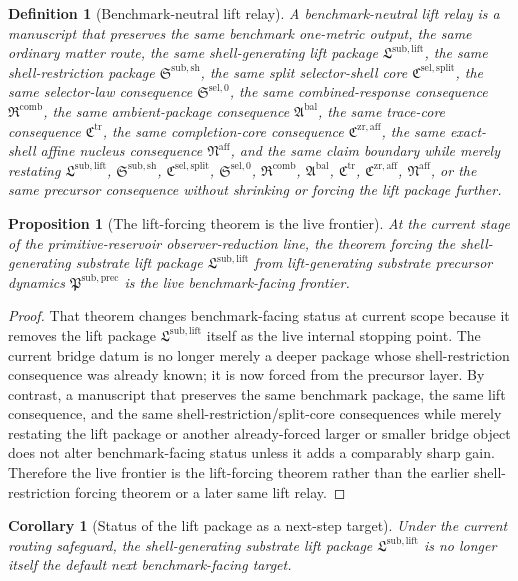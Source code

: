 \documentclass[11pt]{article}
\newcommand{\CompletionCore}{\mathfrak C^{\mathrm{zr,aff}}}
\newcommand{\TraceCore}{\mathfrak C^{\mathrm{tr}}}
\newcommand{\AffineNucleus}{\mathfrak N^{\mathrm{aff}}}
\newcommand{\AmbientPackage}{\mathfrak A^{\mathrm{bal}}}
\newcommand{\CombinedLaw}{\mathfrak R^{\mathrm{comb}}}
\newcommand{\SelectorLaw}{\mathfrak S^{\mathrm{sel},0}}
\newcommand{\SelectorCore}{\mathfrak C^{\mathrm{sel,split}}}
\newcommand{\ShellRestriction}{\mathfrak S^{\mathrm{sub,sh}}}
\newcommand{\LiftPackage}{\mathfrak L^{\mathrm{sub,lift}}}
\newcommand{\PrecursorPackage}{\mathfrak P^{\mathrm{sub,prec}}}
\newtheorem{definition}{Definition}
\newtheorem{proposition}{Proposition}
\newtheorem{corollary}{Corollary}
\begin{document}
\begin{definition}[Benchmark-neutral lift relay]
A \emph{benchmark-neutral lift relay} is a manuscript that preserves the same benchmark one-metric output, the same ordinary matter route, the same shell-generating lift package \(\LiftPackage\), the same shell-restriction package \(\ShellRestriction\), the same split selector-shell core \(\SelectorCore\), the same selector-law consequence \(\SelectorLaw\), the same combined-response consequence \(\CombinedLaw\), the same ambient-package consequence \(\AmbientPackage\), the same trace-core consequence \(\TraceCore\), the same completion-core consequence \(\CompletionCore\), the same exact-shell affine nucleus consequence \(\AffineNucleus\), and the same claim boundary while merely restating \(\LiftPackage\), \(\ShellRestriction\), \(\SelectorCore\), \(\SelectorLaw\), \(\CombinedLaw\), \(\AmbientPackage\), \(\TraceCore\), \(\CompletionCore\), \(\AffineNucleus\), or the same precursor consequence without shrinking or forcing the lift package further.
\end{definition}

\begin{proposition}[The lift-forcing theorem is the live frontier]
At the current stage of the primitive-reservoir observer-reduction line, the theorem forcing the shell-generating substrate lift package \(\LiftPackage\) from lift-generating substrate precursor dynamics \(\PrecursorPackage\) is the live benchmark-facing frontier.
\end{proposition}

\begin{proof}
That theorem changes benchmark-facing status at current scope because it removes the lift package \(\LiftPackage\) itself as the live internal stopping point. The current bridge datum is no longer merely a deeper package whose shell-restriction consequence was already known; it is now forced from the precursor layer. By contrast, a manuscript that preserves the same benchmark package, the same lift consequence, and the same shell-restriction/split-core consequences while merely restating the lift package or another already-forced larger or smaller bridge object does not alter benchmark-facing status unless it adds a comparably sharp gain. Therefore the live frontier is the lift-forcing theorem rather than the earlier shell-restriction forcing theorem or a later same lift relay.
\end{proof}

\begin{corollary}[Status of the lift package as a next-step target]
Under the current routing safeguard, the shell-generating substrate lift package \(\LiftPackage\) is no longer itself the default next benchmark-facing target.
\end{corollary}
\end{document}
